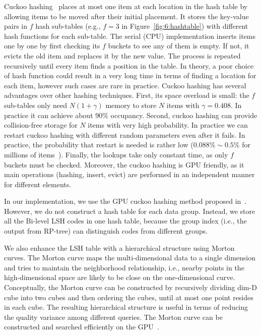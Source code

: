 Cuckoo hashing~\cite{Pagh:2004:CH} places at most one item at each location in the hash table by allowing items to be moved after their initial placement. It stores the key-value pairs in $f$ hash sub-tables (e.g., $f = 3$ in Figure~\ref{fig:6:hashtable}) with different hash functions for each sub-table. The serial (CPU) implementation inserts items one by one by first checking its $f$ buckets to see any of them is empty. If not, it evicts the old item and replaces it by the new value. The process is repeated recursively until every item finds a position in the table. In theory, a poor choice of hash function could result in a very long time in terms of finding a location for each item, however such cases are rare in practice.
Cuckoo hashing has several advantages over other hashing techniques. First, its space overload is small: the $f$ sub-tables only need $N(1+\gamma)$ memory to store $N$ items with $\gamma = 0.408$. In practice it can achieve about $90\%$ occupancy. Second, cuckoo hashing can provide collision-free storage for $N$ items with very high probability. In practice we can restart cuckoo hashing with different random parameters even after it fails. In practice, the probability that restart is needed is rather low ($0.088\%\sim0.5\%$ for millions of items~\cite{Alcantara:2009:RPH}). Finally, the lookups take only constant time, as only $f$ buckets must be checked. Moreover, the cuckoo hashing is GPU friendly, as it main operations (hashing, insert, evict) are performed in an independent manner for different elements.

In our implementation, we use the GPU cuckoo hashing method proposed in~\cite{Alcantara:2009:RPH}. However, we do not construct a hash table for each data group. Instead, we store all the Bi-level LSH codes in one hash table, because the group index (i.e., the output from RP-tree) can distinguish codes from different groups.

We also enhance the LSH table with a hierarchical structure using Morton curves. The Morton curve maps the multi-dimensional data to a
single dimension and tries to maintain the neighborhood relationship, i.e., nearby points in the high-dimensional space are likely to be close on the one-dimensional curve. Conceptually, the Morton curve can be constructed by recursively
dividing dim-D cube into two cubes and then ordering the cubes, until at most one point resides in each cube. The resulting hierarchical structure is useful in terms of reducing the quality variance among different queries. The Morton curve can be constructed and searched efficiently on the GPU~\cite{LauterbachGSLM09}.


